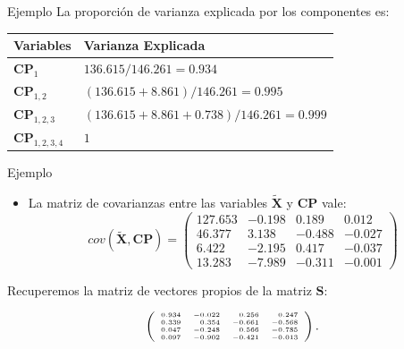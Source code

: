 \documentclass[
  ignorenonframetext,
]{beamer}
\providecommand{\tightlist}{%
  \setlength{\itemsep}{0pt}\setlength{\parskip}{0pt}}
\begin{document}
\begin{frame}{Ejemplo}
\label{ejemplo-18}
La proporción de varianza explicada por los componentes es:

\begin{tabular}{|l|l|}\hline
Variables&Varianza Explicada\\\hline
$\mathbf{CP}_1$&$136.615/146.261=0.934$\\\hline
$\mathbf{CP}_{1,2}$&$(136.615+8.861)/146.261=0.995$\\\hline
$\mathbf{CP}_{1,2,3}$&$(136.615+8.861+0.738)/146.261=0.999$\\\hline
$\mathbf{CP}_{1,2,3,4}$&$1$\\\hline
\end{tabular}
\end{frame}

\begin{frame}{Ejemplo}
\label{ejemplo-19}
\begin{itemize}
\tightlist
\item
  La matriz de covarianzas entre las variables \(\tilde{\mathbf{X}}\) y
  \(\mathbf{CP}\) vale: \[
  cov(\tilde{\mathbf{X}},\mathbf{CP})=
  \left(
  \begin{array}{rrrr}
  127.653 & -0.198 & 0.189 & 0.012 \\
   46.377 & 3.138 & -0.488 & -0.027 \\
   6.422 & -2.195 & 0.417 & -0.037 \\
   13.283 & -7.989 & -0.311 & -0.001 
  \end{array}
  \right)
  \]
\end{itemize}

Recuperemos la matriz de vectores propios de la matriz \(\mathbf{S}\):

\[
{\tiny \left(
\begin{array}{rrrr}
0.934 & -0.022 & 0.256 & 0.247 \\
 0.339 & 0.354 & -0.661 & -0.568 \\
 0.047 & -0.248 & 0.566 & -0.785 \\
 0.097 & -0.902 & -0.421 & -0.013 
\end{array}
\right)
.}
\]
\end{frame}
\end{document}
